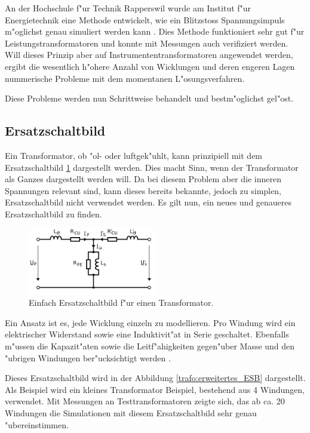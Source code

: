 \begin{refsection}
An der Hochschule f"ur Technik Rapperswil wurde am Institut f"ur Energietechnik eine Methode entwickelt, wie ein Blitzstoss Spannungsimpuls m"oglichst genau simuliert werden kann \cite{trafo:BILImpulse}. Dies Methode funktioniert sehr gut f"ur Leistungstransformatoren und konnte mit Messungen auch verifiziert werden. 
Will dieses Prinzip aber auf Instrumententransformatoren angewendet werden, ergibt die wesentlich h"ohere Anzahl von Wicklungen und deren engeren Lagen nummerische Probleme mit dem momentanen L"osungsverfahren. 

Diese Probleme werden nun Schrittweise behandelt und bestm"oglichst gel"ost. 


\subsection{Ersatzschaltbild}
Ein Transformator, ob "ol- oder luftgek"uhlt, kann prinzipiell mit dem Ersatzschaltbild \ref{trafo:einfaches_ESB} dargestellt werden. Dies macht Sinn, wenn der Transformator als Ganzes dargestellt werden will. Da bei diesem Problem aber die inneren Spannungen relevant sind, kann dieses bereits bekannte, jedoch zu simplen, Ersatzschaltbild nicht verwendet werden. Es gilt nun, ein neues und genaueres Ersatzschaltbild zu finden. 

\begin{figure}
	\centering
	\includegraphics[width=0.5\textwidth]{./trafo/images/Einfaches_ESB.png}
	\caption[Einfach Ersatzschaltbild f"ur einen Transformator]{Einfach Ersatzschaltbild f"ur einen Transformator.}
	\label{trafo:einfaches_ESB}
\end{figure}

Ein Ansatz ist es, jede Wicklung einzeln zu modellieren. Pro Windung wird ein elektrischer Widerstand sowie eine Induktivit"at in Serie geschaltet. Ebenfalls m"ussen die Kapazit"aten sowie die Leitf"ahigkeiten gegen"uber Masse und den "ubrigen Windungen ber"ucksichtigt werden \cite{trafo:BILImpulse}. 

Dieses Ersatzschaltbild wird in der Abbildung \ref{trafo:erweitertes_ESB} dargestellt. Als Beispiel wird ein kleines Transformator Beispiel, bestehend aus 4 Windungen, verwendet. Mit Messungen an Testtransformatoren zeigte sich, das ab ca. 20 Windungen die Simulationen mit diesem Ersatzschaltbild sehr genau "ubereinstimmen. 


\end{refsection}
